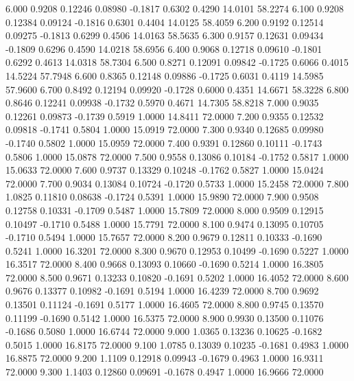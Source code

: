    6.000   0.9208   0.12246   0.08980  -0.1817   0.6302   0.4290  14.0101  58.2274
   6.100   0.9208   0.12384   0.09124  -0.1816   0.6301   0.4404  14.0125  58.4059
   6.200   0.9192   0.12514   0.09275  -0.1813   0.6299   0.4506  14.0163  58.5635
   6.300   0.9157   0.12631   0.09434  -0.1809   0.6296   0.4590  14.0218  58.6956
   6.400   0.9068   0.12718   0.09610  -0.1801   0.6292   0.4613  14.0318  58.7304
   6.500   0.8271   0.12091   0.09842  -0.1725   0.6066   0.4015  14.5224  57.7948
   6.600   0.8365   0.12148   0.09886  -0.1725   0.6031   0.4119  14.5985  57.9600
   6.700   0.8492   0.12194   0.09920  -0.1728   0.6000   0.4351  14.6671  58.3228
   6.800   0.8646   0.12241   0.09938  -0.1732   0.5970   0.4671  14.7305  58.8218
   7.000   0.9035   0.12261   0.09873  -0.1739   0.5919   1.0000  14.8411  72.0000
   7.200   0.9355   0.12532   0.09818  -0.1741   0.5804   1.0000  15.0919  72.0000
   7.300   0.9340   0.12685   0.09980  -0.1740   0.5802   1.0000  15.0959  72.0000
   7.400   0.9391   0.12860   0.10111  -0.1743   0.5806   1.0000  15.0878  72.0000
   7.500   0.9558   0.13086   0.10184  -0.1752   0.5817   1.0000  15.0633  72.0000
   7.600   0.9737   0.13329   0.10248  -0.1762   0.5827   1.0000  15.0424  72.0000
   7.700   0.9034   0.13084   0.10724  -0.1720   0.5733   1.0000  15.2458  72.0000
   7.800   1.0825   0.11810   0.08638  -0.1724   0.5391   1.0000  15.9890  72.0000
   7.900   0.9508   0.12758   0.10331  -0.1709   0.5487   1.0000  15.7809  72.0000
   8.000   0.9509   0.12915   0.10497  -0.1710   0.5488   1.0000  15.7791  72.0000
   8.100   0.9474   0.13095   0.10705  -0.1710   0.5494   1.0000  15.7657  72.0000
   8.200   0.9679   0.12811   0.10333  -0.1690   0.5241   1.0000  16.3201  72.0000
   8.300   0.9670   0.12953   0.10499  -0.1690   0.5227   1.0000  16.3517  72.0000
   8.400   0.9668   0.13093   0.10660  -0.1690   0.5214   1.0000  16.3805  72.0000
   8.500   0.9671   0.13233   0.10820  -0.1691   0.5202   1.0000  16.4052  72.0000
   8.600   0.9676   0.13377   0.10982  -0.1691   0.5194   1.0000  16.4239  72.0000
   8.700   0.9692   0.13501   0.11124  -0.1691   0.5177   1.0000  16.4605  72.0000
   8.800   0.9745   0.13570   0.11199  -0.1690   0.5142   1.0000  16.5375  72.0000
   8.900   0.9930   0.13500   0.11076  -0.1686   0.5080   1.0000  16.6744  72.0000
   9.000   1.0365   0.13236   0.10625  -0.1682   0.5015   1.0000  16.8175  72.0000
   9.100   1.0785   0.13039   0.10235  -0.1681   0.4983   1.0000  16.8875  72.0000
   9.200   1.1109   0.12918   0.09943  -0.1679   0.4963   1.0000  16.9311  72.0000
   9.300   1.1403   0.12860   0.09691  -0.1678   0.4947   1.0000  16.9666  72.0000
